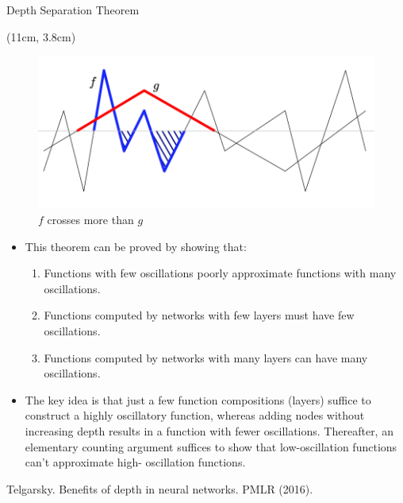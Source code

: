 \documentclass[serif, aspectratio=169]{beamer}
\begin{document}
\begin{frame}{Depth Separation Theorem}
	\begin{textblock*}{5cm}(11cm, 3.8cm)
		\begin{figure}
			\includegraphics[keepaspectratio, scale=0.14]{pic/depth}
			\caption*{$f$ crosses more than $g$}
		\end{figure}
	\end{textblock*}
	
	\begin{itemize}
		\item This theorem can be proved by showing that:
		\begin{enumerate}
			\item Functions with few oscillations poorly approximate functions with many oscillations.
			\item Functions computed by networks with few layers must have few oscillations.
			\item Functions computed by networks with many layers can have many oscillations.
		\end{enumerate}
		\vspace{0.3cm}
		\item The key idea is that just a few function compositions \newline (layers) suffice to construct a highly oscillatory function, \newline whereas adding nodes without increasing depth results \newline  in a function with fewer oscillations. Thereafter, an \newline elementary counting argument suffices to show that \newline low-oscillation  functions can't approximate high- \newline oscillation functions.
		 
	\end{itemize}
	\vspace{0.9cm}
	\scriptsize Telgarsky. Benefits of depth in neural networks. PMLR (2016).
\end{frame}
\end{document}
